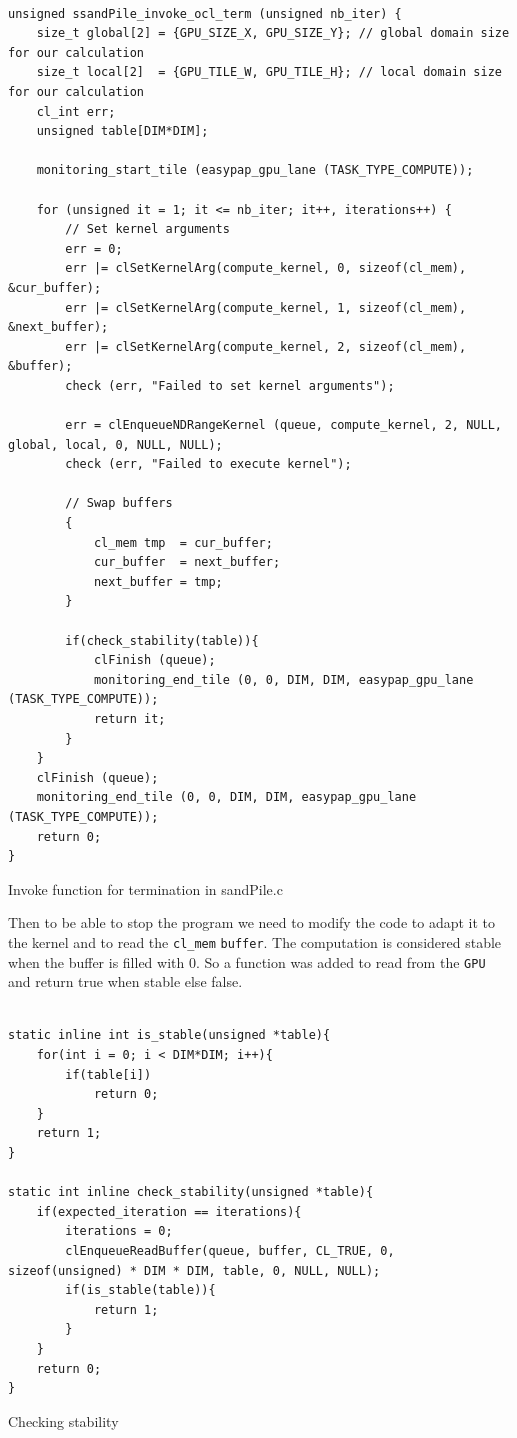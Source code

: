 \documentclass{report}
\def\GPU{\texttt{GPU}}
\newcommand{\code}[1]{\texttt{#1}}
\begin{document}
\begin{listing}[H]
	\begin{verbatim}

unsigned ssandPile_invoke_ocl_term (unsigned nb_iter) {
    size_t global[2] = {GPU_SIZE_X, GPU_SIZE_Y}; // global domain size for our calculation
    size_t local[2]  = {GPU_TILE_W, GPU_TILE_H}; // local domain size for our calculation
    cl_int err;
    unsigned table[DIM*DIM];

    monitoring_start_tile (easypap_gpu_lane (TASK_TYPE_COMPUTE));

    for (unsigned it = 1; it <= nb_iter; it++, iterations++) {
        // Set kernel arguments
        err = 0;
        err |= clSetKernelArg(compute_kernel, 0, sizeof(cl_mem), &cur_buffer);
        err |= clSetKernelArg(compute_kernel, 1, sizeof(cl_mem), &next_buffer);
        err |= clSetKernelArg(compute_kernel, 2, sizeof(cl_mem), &buffer);
        check (err, "Failed to set kernel arguments");

        err = clEnqueueNDRangeKernel (queue, compute_kernel, 2, NULL, global, local, 0, NULL, NULL);
        check (err, "Failed to execute kernel");

        // Swap buffers
        {
            cl_mem tmp  = cur_buffer;
            cur_buffer  = next_buffer;
            next_buffer = tmp;
        }

        if(check_stability(table)){
            clFinish (queue);
            monitoring_end_tile (0, 0, DIM, DIM, easypap_gpu_lane (TASK_TYPE_COMPUTE));
            return it;
        }
    }
    clFinish (queue);
    monitoring_end_tile (0, 0, DIM, DIM, easypap_gpu_lane (TASK_TYPE_COMPUTE));
    return 0;
}

\end{verbatim}
	\caption{Invoke function for termination in sandPile.c}
\end{listing}



Then to be able to stop the program we need to modify the code to adapt it to the kernel
and to read the \texttt{cl\_mem} \code{buffer}.
The computation is considered stable when the buffer is filled with 0.
So a function was added to read from the \GPU{} and return true when stable else false.
\begin{listing}[H]
	\begin{verbatim}

static inline int is_stable(unsigned *table){
    for(int i = 0; i < DIM*DIM; i++){
        if(table[i])
            return 0;
    }
    return 1;
}

static int inline check_stability(unsigned *table){
    if(expected_iteration == iterations){
        iterations = 0;
        clEnqueueReadBuffer(queue, buffer, CL_TRUE, 0, sizeof(unsigned) * DIM * DIM, table, 0, NULL, NULL);
        if(is_stable(table)){
            return 1;
        }
    }
    return 0;
}
\end{verbatim}
	\caption{Checking stability}
\end{listing}
\end{document}
